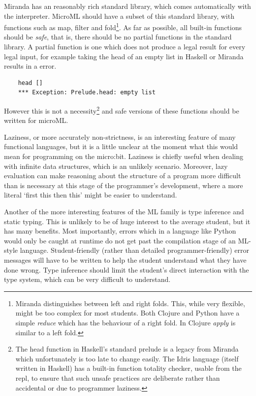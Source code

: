 \documentclass[12pt, a4paper]{report}
\begin{document}
Miranda has an reasonably rich standard library, which comes automatically with the interpreter. MicroML
should have a subset of this standard library, with functions such as map, filter and fold\footnote{Miranda 
    distinguishes between left and right folds. This, while very flexible, might be
too complex for most students. Both Clojure and Python have a simple \textit{reduce} which has the
behaviour of a right fold. In Clojure \textit{apply} is similar to a left fold.}. As far as possible, 
all built-in functions should be \textit{safe}, that is, there should be no
partial functions in the standard library. A partial function is one which does not produce a legal
result for every legal input, for example taking the head of an empty list in Haskell or Miranda
results in a error.

\begin{verbatim}
    head []
    *** Exception: Prelude.head: empty list
\end{verbatim} 

However this is not a necessity\footnote{The head function in Haskell's standard prelude is a legacy
    from Miranda which unfortunately is too late to change easily. The Idris language (itself
    written in Haskell) has a built-in function totality checker, usable from the repl, to ensure
that such unsafe practices are deliberate rather than accidental or due to programmer laziness.} 
and safe versions of these functions should be written for microML. 

Laziness, or more accurately non-strictness,  is an interesting feature of many functional languages, 
but it is a little unclear at the moment what this would mean for programming on the micro:bit. 
Laziness is chiefly useful when dealing with infinite data structures, which is an unlikely
scenario. Moreover, lazy evaluation can make reasoning about the structure of a program more
difficult than is necessary at this stage of the programmer's development, where a more literal
`first this then this' might be easier to understand. 

Another of the more interesting features of the ML family is type inference and static typing. This
is unlikely to be of huge interest to the average student, but it has many benefits. Most
importantly, errors which in a language like Python would only be caught at runtime do not get past
the compilation stage of an ML-style language. Student-friendly (rather than detailed
programmer-friendly) error messages will have to be
written to help the student understand what they have done wrong. Type inference should limit the
student's direct interaction with the type system, which can be very difficult to understand.
\end{document}
